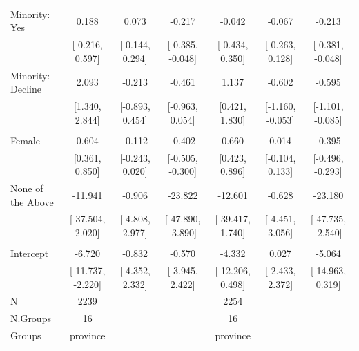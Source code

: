 \documentclass[
  10,
  letterpaper,
  DIV=11,
  numbers=noendperiod]{scrartcl}
\begin{document}
\begin{table}
\begin{tabular}[t]{lcccccc}
\hspace{1em}Minority: Yes & 0.188 & 0.073 & -0.217 & -0.042 & -0.067 & -0.213\\
\hspace{1em} & {}[-0.216, 0.597] & {}[-0.144, 0.294] & {}[-0.385, -0.048] & {}[-0.434, 0.350] & {}[-0.263, 0.128] & {}[-0.381, -0.048]\\
\hspace{1em}Minority: Decline & 2.093 & -0.213 & -0.461 & 1.137 & -0.602 & -0.595\\
\hspace{1em} & {}[1.340, 2.844] & {}[-0.893, 0.454] & {}[-0.963, 0.054] & {}[0.421, 1.830] & {}[-1.160, -0.053] & {}[-1.101, -0.085]\\
\addlinespace[0.3em]
\multicolumn{7}{l}{\cellcolor[HTML]{3498DB}{\textbf{Gender}}}\\
\hspace{1em}Female & 0.604 & -0.112 & -0.402 & 0.660 & 0.014 & -0.395\\
\hspace{1em} & {}[0.361, 0.850] & {}[-0.243, 0.020] & {}[-0.505, -0.300] & {}[0.423, 0.896] & {}[-0.104, 0.133] & {}[-0.496, -0.293]\\
\hspace{1em}None of the Above & -11.941 & -0.906 & -23.822 & -12.601 & -0.628 & -23.180\\
\hspace{1em} & {}[-37.504, 2.020] & {}[-4.808, 2.977] & {}[-47.890, -3.890] & {}[-39.417, 1.740] & {}[-4.451, 3.056] & {}[-47.735, -2.540]\\
\addlinespace[0.3em]
\multicolumn{7}{l}{\cellcolor[HTML]{3498DB}{\textbf{Intercept}}}\\
\hspace{1em}Intercept & -6.720 & -0.832 & -0.570 & -4.332 & 0.027 & -5.064\\
\hspace{1em} & {}[-11.737, -2.220] & {}[-4.352, 2.332] & {}[-3.945, 2.422] & {}[-12.206, 0.498] & {}[-2.433, 2.372] & {}[-14.963, 0.319]\\
\midrule
N & 2239 &  &  & 2254 &  & \\
N.Groups & 16 &  &  & 16 &  & \\
Groups & province &  &  & province &  & \\
\bottomrule
\end{tabular}
\end{table}
\end{document}
